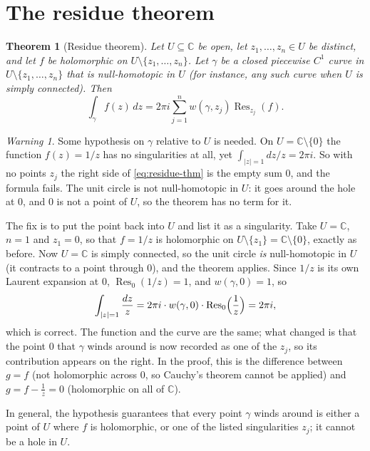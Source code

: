 \documentclass[11pt]{article}
\theoremstyle{plain}
\newtheorem{theorem}{Theorem}[section]
\theoremstyle{definition}
\theoremstyle{remark}
\newtheorem*{warning}{Warning}
\numberwithin{equation}{section}
\newcommand{\C}{\mathbb{C}}
\begin{document}
\section{The residue theorem}
\begin{theorem}[Residue theorem]\label{thm:residue}
Let $U\subseteq\C$ be open, let $z_1,\dots,z_n\in U$ be distinct, and let
$f$ be holomorphic on $U\setminus\{z_1,\dots,z_n\}$. Let $\gamma$ be a closed
piecewise $C^1$ curve in $U\setminus\{z_1,\dots,z_n\}$ that is
null-homotopic in $U$ (for instance, any such curve when $U$ is simply
connected). Then
\begin{equation}\label{eq:residue-thm}
 \boxed{\displaystyle\int_\gamma f(z)\,dz
 =2\pi i\sum_{j=1}^{n}w(\gamma,z_j)\operatorname{Res}_{z_j}(f).}
\end{equation}
\end{theorem}

\begin{warning}
Some hypothesis on $\gamma$ relative to $U$ is needed. On
$U=\C\setminus\{0\}$ the function $f(z)=1/z$ has no singularities at all,
yet $\int_{|z|=1}dz/z=2\pi i$. So with no points $z_j$ the right side of
\eqref{eq:residue-thm} is the empty sum $0$, and the formula fails. The
unit circle is not null-homotopic in $U$: it goes around the hole at $0$,
and $0$ is not a point of $U$, so the theorem has no term for it.

The fix is to put the point back into $U$ and list it as a singularity.
Take $U=\C$, $n=1$ and $z_1=0$, so that $f=1/z$ is holomorphic on
$U\setminus\{z_1\}=\C\setminus\{0\}$, exactly as before. Now $U=\C$ is
simply connected, so the unit circle \emph{is} null-homotopic in $U$ (it
contracts to a point through $0$), and the theorem applies. Since $1/z$ is
its own Laurent expansion at $0$, $\operatorname{Res}_0(1/z)=1$, and
$w(\gamma,0)=1$, so
\begin{equation}
 \int_{|z|=1}\frac{dz}{z}=2\pi i\cdot w(\gamma,0)\cdot\operatorname{Res}_0
 \Bigl(\frac1z\Bigr)=2\pi i,
\end{equation}
which is correct. The function and the curve are the same; what changed
is that the point $0$ that $\gamma$ winds around is now recorded as one
of the $z_j$, so its contribution appears on the right. In the proof, this
is the difference between $g=f$ (not holomorphic across $0$, so Cauchy's
theorem cannot be applied) and $g=f-\frac1z=0$ (holomorphic on all of
$\C$).

In general, the hypothesis guarantees that every point $\gamma$ winds
around is either a point of $U$ where $f$ is holomorphic, or one of the
listed singularities $z_j$; it cannot be a hole in $U$.
\end{warning}
\end{document}
